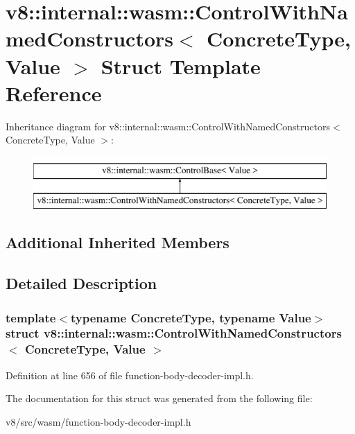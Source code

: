 \hypertarget{structv8_1_1internal_1_1wasm_1_1ControlWithNamedConstructors}{}\section{v8\+:\+:internal\+:\+:wasm\+:\+:Control\+With\+Named\+Constructors$<$ Concrete\+Type, Value $>$ Struct Template Reference}
\label{structv8_1_1internal_1_1wasm_1_1ControlWithNamedConstructors}
Inheritance diagram for v8\+:\+:internal\+:\+:wasm\+:\+:Control\+With\+Named\+Constructors$<$ Concrete\+Type, Value $>$\+:\begin{figure}[H]
\begin{center}
\leavevmode
\includegraphics[height=2.000000cm]{structv8_1_1internal_1_1wasm_1_1ControlWithNamedConstructors}
\end{center}
\end{figure}
\subsection*{Additional Inherited Members}


\subsection{Detailed Description}
\subsubsection*{template$<$typename Concrete\+Type, typename Value$>$\newline
struct v8\+::internal\+::wasm\+::\+Control\+With\+Named\+Constructors$<$ Concrete\+Type, Value $>$}



Definition at line 656 of file function-\/body-\/decoder-\/impl.\+h.



The documentation for this struct was generated from the following file\+:\begin{DoxyCompactItemize}
\item 
v8/src/wasm/function-\/body-\/decoder-\/impl.\+h\end{DoxyCompactItemize}
